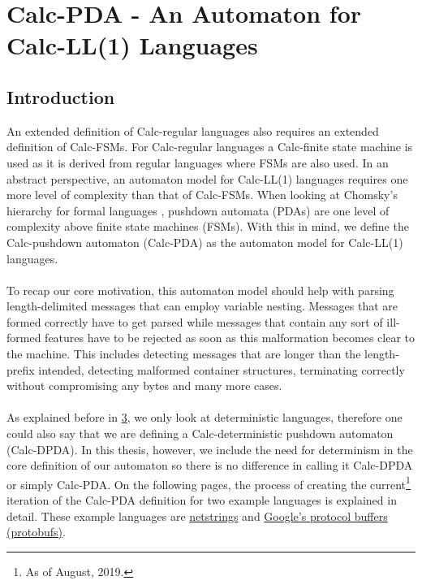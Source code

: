 \section{Calc-PDA - An Automaton for Calc-LL(1) Languages}
\label{4.0}
\subsection{Introduction}
\label{4.1}
An extended definition of Calc-regular languages also requires an extended definition of Calc-FSMs. For Calc-regular languages a Calc-finite state machine is used as it is derived from regular languages where FSMs are also used. In an abstract perspective, an automaton model for Calc-LL(1) languages requires one more level of complexity than that of Calc-FSMs. When looking at Chomsky's hierarchy for formal languages \cite{Chomsky-Hierarchy}, pushdown automata (PDAs) are one level of complexity above finite state machines (FSMs). With this in mind, we define the Calc-pushdown automaton (Calc-PDA) as the automaton model for Calc-LL(1) languages.\\\\
To recap our core motivation, this automaton model should help with parsing length-delimited messages that can employ variable nesting. Messages that are formed correctly have to get parsed while messages that contain any sort of ill-formed features have to be rejected as soon as this malformation becomes clear to the machine. This includes detecting messages that are longer than the length-prefix intended, detecting malformed container structures, terminating correctly without compromising any bytes and many more cases.\\\\
As explained before in \hyperref[3.0]{3}, we only look at deterministic languages, therefore one could also say that we are defining a Calc-deterministic pushdown automaton (Calc-DPDA). In this thesis, however, we include the need for determinism in the core definition of our automaton so there is no difference in calling it Calc-DPDA or simply Calc-PDA. On the following pages, the process of creating the current\footnote{As of August, 2019.} iteration of the Calc-PDA definition for two example languages is explained in detail. These example languages are \hyperref[1.4]{netstrings} and \hyperref[1.5]{Google's protocol buffers (protobufs)}.

